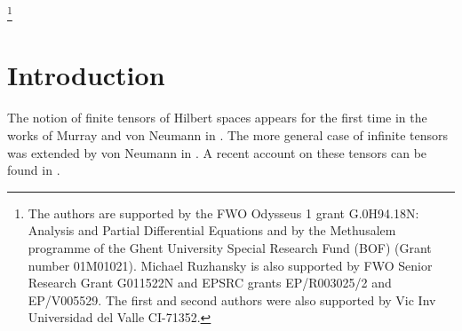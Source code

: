 \documentclass[a4paper,12pt,reqno]{amsart}
\theoremstyle{definition}
\theoremstyle{remark}
\numberwithin{equation}{section}
\begin{document}
\thanks{The authors are supported by the FWO Odysseus 1 grant G.0H94.18N: Analysis and Partial Differential Equations and by the Methusalem programme of the Ghent University Special Research Fund (BOF) (Grant number 01M01021). Michael Ruzhansky is also supported by FWO Senior Research Grant G011522N and EPSRC grants EP/R003025/2 and EP/V005529. The first and second authors were also supported by Vic Inv Universidad del Valle CI-71352.}



\date{\today}
\begin{abstract}
In this work we study Schatten-von Neumann classes of tensor products of invariant operators on  Hilbert spaces. In the first part we  first deduce some spectral properties for tensors of anharmonic oscillators thanks to the knowledge on corresponding Schatten-von Neumann properties. In the second part we specialised on tensors of invariant operators. In the special case where a suitable Fourier analysis  associated to a fixed partition of a Hilbert space into finite dimensional subspaces  is available we also give the corresponding formulae in terms of symbols. We also give a sufficient condition for Dixmier traceability for a class of finite tensors of pseudo-differential operators on the flat torus. 
\end{abstract}

\maketitle

\section{Introduction}
The notion of finite tensors of Hilbert spaces appears for the first time in the works of  Murray and von Neumann in \cite{Murray}. The more general case of infinite tensors was extended by von Neumann in \cite{Ne}.  A recent account on these tensors can be found in  \cite{weav:book}.\\
\end{document}

